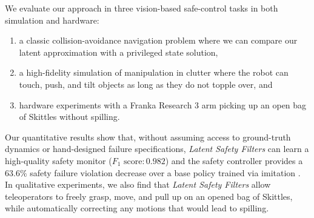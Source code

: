 We evaluate our approach in three vision-based safe-control tasks in both simulation and hardware: 
\begin{enumerate}
    \item a classic collision-avoidance navigation problem where we can compare our latent approximation with a privileged state solution, 
    \item a high-fidelity simulation of manipulation in clutter where the robot can touch, push, and tilt objects as long as they do not topple over, and 
    \item hardware experiments with a Franka Research 3
       arm picking up an open bag of Skittles without spilling. 
\end{enumerate}
Our quantitative results show that, without assuming access to ground-truth dynamics or hand-designed failure specifications, \textit{Latent Safety Filters} can learn a high-quality safety monitor ($F_1 \text{~score}: 0.982$) and the safety controller provides a $63.6\%$ safety failure violation decrease over a base policy trained via imitation \cite{chi2024diffusionpolicy}. 
In qualitative experiments, we also find that \textit{Latent Safety Filters} allow teleoperators to freely grasp, move, and pull up on an opened bag of Skittles, while automatically correcting any motions that would lead to spilling. 




